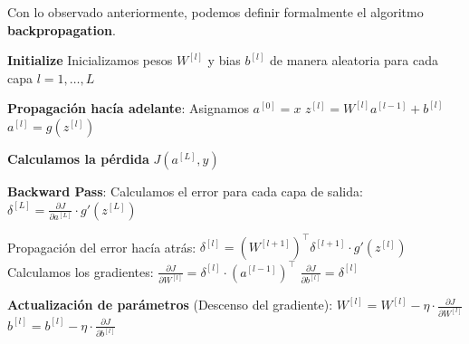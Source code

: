 


Con lo observado anteriormente, podemos definir formalmente el algoritmo \textbf{backpropagation}.

\begin{algorithm}
    \caption{Algoritmo Backpropagation}
    \begin{algorithmic}[1]
        \State \textbf{Initialize} Inicializamos pesos $W^{[l]}$ y bias $b^{[l]}$ de manera aleatoria para cada capa $l = 1, \dots, L$


        \State \textbf{Propagación hacía adelante}:
        \State Asignamos $a^{[0]} = x$
        \State $z^{[l]} = W^{[l]} a^{[l-1]} + b^{[l]}$
        \State $a^{[l]} = g(z^{[l]})$
        \EndFor

        \State \textbf{Calculamos la pérdida} $J(a^{[L]}, y)$

        \State \textbf{Backward Pass}:
        \State Calculamos el error para cada capa de salida:
        \State $\delta^{[L]} = \frac{\partial J}{\partial a^{[L]}} \cdot g'(z^{[L]})$

        \State Propagación del error hacía atrás:
        \State $\delta^{[l]} = (W^{[l+1]})^\top \delta^{[l+1]} \cdot g'(z^{[l]})$
        \State Calculamos los gradientes:
        \State $\frac{\partial J}{\partial W^{[l]}} = \delta^{[l]} \cdot (a^{[l-1]})^\top$
        \State $\frac{\partial J}{\partial b^{[l]}} = \delta^{[l]}$
        \EndFor

        \State \textbf{Actualización de parámetros} (Descenso del gradiente):
        \State $W^{[l]} = W^{[l]} - \eta \cdot \frac{\partial J}{\partial W^{[l]}}$
        \State $b^{[l]} = b^{[l]} - \eta \cdot \frac{\partial J}{\partial b^{[l]}}$
        \EndFor

        \EndFor
        \EndFor

    \end{algorithmic}
\end{algorithm}

